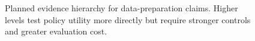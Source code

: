 \begin{figure}[t]
\centering
\fbox{\rule{0pt}{5.8cm}\rule{0.96\textwidth}{0pt}}
\caption{Planned evidence hierarchy for data-preparation claims. Higher levels test policy utility more directly but require stronger controls and greater evaluation cost.}
\label{fig:evidence-hierarchy}
\end{figure}

